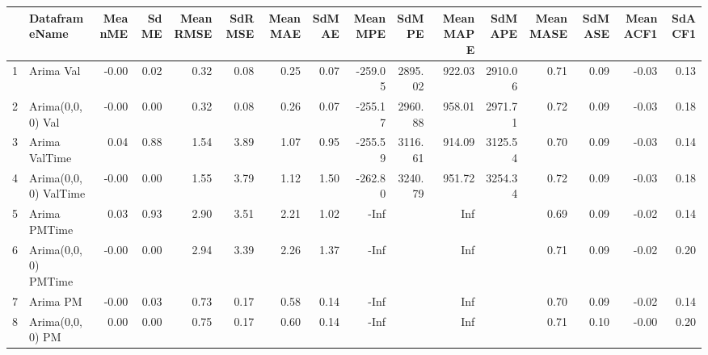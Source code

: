 \begin{table}[ht]
\centering
\begin{tabular}{rlrrrrrrrrrrrrrr}
  \hline
 & DataframeName & MeanME & SdME & MeanRMSE & SdRMSE & MeanMAE & SdMAE & MeanMPE & SdMPE & MeanMAPE & SdMAPE & MeanMASE & SdMASE & MeanACF1 & SdACF1 \\ 
  \hline
1 & Arima Val & -0.00 & 0.02 & 0.32 & 0.08 & 0.25 & 0.07 & -259.05 & 2895.02 & 922.03 & 2910.06 & 0.71 & 0.09 & -0.03 & 0.13 \\ 
  2 & Arima(0,0,0) Val & -0.00 & 0.00 & 0.32 & 0.08 & 0.26 & 0.07 & -255.17 & 2960.88 & 958.01 & 2971.71 & 0.72 & 0.09 & -0.03 & 0.18 \\ 
  3 & Arima ValTime & 0.04 & 0.88 & 1.54 & 3.89 & 1.07 & 0.95 & -255.59 & 3116.61 & 914.09 & 3125.54 & 0.70 & 0.09 & -0.03 & 0.14 \\ 
  4 & Arima(0,0,0) ValTime & -0.00 & 0.00 & 1.55 & 3.79 & 1.12 & 1.50 & -262.80 & 3240.79 & 951.72 & 3254.34 & 0.72 & 0.09 & -0.03 & 0.18 \\ 
  5 & Arima PMTime & 0.03 & 0.93 & 2.90 & 3.51 & 2.21 & 1.02 & -Inf &  & Inf &  & 0.69 & 0.09 & -0.02 & 0.14 \\ 
  6 & Arima(0,0,0) PMTime & -0.00 & 0.00 & 2.94 & 3.39 & 2.26 & 1.37 & -Inf &  & Inf &  & 0.71 & 0.09 & -0.02 & 0.20 \\ 
  7 & Arima PM & -0.00 & 0.03 & 0.73 & 0.17 & 0.58 & 0.14 & -Inf &  & Inf &  & 0.70 & 0.09 & -0.02 & 0.14 \\ 
  8 & Arima(0,0,0) PM & 0.00 & 0.00 & 0.75 & 0.17 & 0.60 & 0.14 & -Inf &  & Inf &  & 0.71 & 0.10 & -0.00 & 0.20 \\ 
   \hline
\end{tabular}
\end{table}
